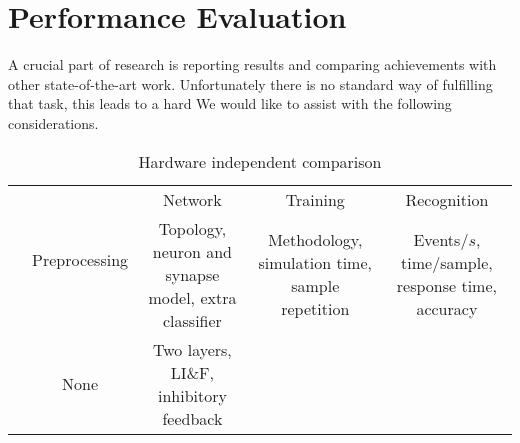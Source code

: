 \section{Performance Evaluation}
\label{sec:eval}

A crucial part of research is reporting results and comparing achievements with other state-of-the-art work. Unfortunately there is no standard way of fulfilling that task, this leads to a hard 
We would like to assist with the following considerations.
\begin{table*}[hbt!]
  \caption{Hardware independent comparison}
  \begin{center}
    \bgroup
    \def\arraystretch{1.5}
    \begin{tabular}{ l  c c c c }
      $ $ &
      \multirow{2}{*}{\begin{minipage}{1.9cm}Preprocessing\end{minipage} }& 
      \begin{minipage}{3.5cm}\centering Network\end{minipage} & 
      \begin{minipage}{3.5cm}\centering Training \end{minipage} & 
      \begin{minipage}{3.5cm}\centering Recognition \end{minipage} \\
      \cline{3-5}
       & 
       & 
      \begin{minipage}{3.5cm}\centering \vspace*{0.1cm} Topology, neuron and synapse model, extra classifier \vspace*{0.1cm} \end{minipage} &
      \begin{minipage}{3.5cm}\centering \vspace*{0.1cm} Methodology, simulation time, sample repetition \end{minipage} & 
      \begin{minipage}{3.5cm}\centering \vspace*{0.1cm} Events/$s$, time/sample, response time, accuracy\end{minipage} \\
      \hline
      \begin{minipage}{3cm} \cite{Diehl2015unsupervised} \end{minipage} & 
       \centering None &
       \begin{minipage}{3.5cm}\centering Two layers, LI\&F, inhibitory feedback  \end{minipage}& 

\end{tabular}
\end{center}
\end{table*}
